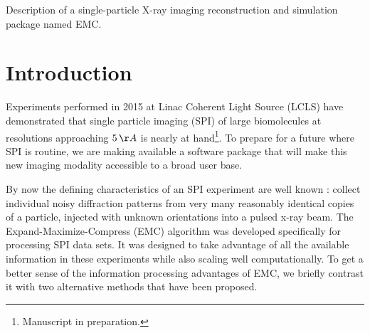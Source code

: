 \documentclass[]{iucr}              %
\begin{document}

\maketitle                        %

\begin{synopsis}
Description of a single-particle X-ray imaging reconstruction and simulation package named EMC.
\end{synopsis}

\begin{abstract}

\end{abstract}



\section{Introduction}

Experiments performed in 2015 at Linac Coherent Light Source (LCLS) \cite{Aquila2015} have demonstrated that single particle imaging (SPI) of large biomolecules at resolutions approaching $5 \,\AA$ is nearly at hand\footnote{Manuscript in preparation.}. To prepare for a future where SPI is routine, we are making available a software package that will make this new imaging modality accessible to a broad user base.

By now the defining characteristics of an SPI experiment are well known \cite{Neutze2000}: collect individual noisy diffraction patterns from very many reasonably identical copies of a particle, injected with unknown orientations into a pulsed x-ray beam. The Expand-Maximize-Compress (EMC) algorithm \cite{loh2009} was developed specifically for processing SPI data sets. It was designed to take advantage of all the available information in these experiments while also scaling well computationally. To get a better sense of the information processing advantages of EMC, we briefly contrast it with two alternative methods that have been proposed.
\end{document}
